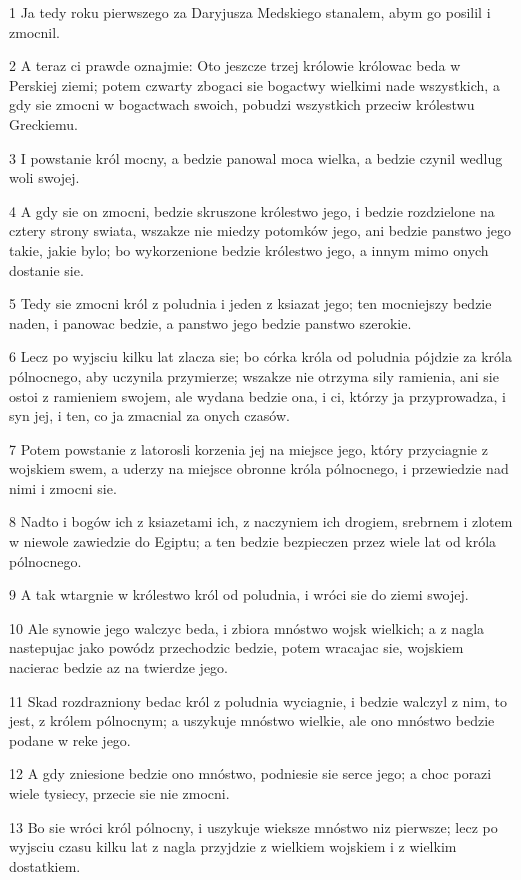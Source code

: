 \par 1 Ja tedy roku pierwszego za Daryjusza Medskiego stanalem, abym go posilil i zmocnil.
\par 2 A teraz ci prawde oznajmie: Oto jeszcze trzej królowie królowac beda w Perskiej ziemi; potem czwarty zbogaci sie bogactwy wielkimi nade wszystkich, a gdy sie zmocni w bogactwach swoich, pobudzi wszystkich przeciw królestwu Greckiemu.
\par 3 I powstanie król mocny, a bedzie panowal moca wielka, a bedzie czynil wedlug woli swojej.
\par 4 A gdy sie on zmocni, bedzie skruszone królestwo jego, i bedzie rozdzielone na cztery strony swiata, wszakze nie miedzy potomków jego, ani bedzie panstwo jego takie, jakie bylo; bo wykorzenione bedzie królestwo jego, a innym mimo onych dostanie sie.
\par 5 Tedy sie zmocni król z poludnia i jeden z ksiazat jego; ten mocniejszy bedzie naden, i panowac bedzie, a panstwo jego bedzie panstwo szerokie.
\par 6 Lecz po wyjsciu kilku lat zlacza sie; bo córka króla od poludnia pójdzie za króla pólnocnego, aby uczynila przymierze; wszakze nie otrzyma sily ramienia, ani sie ostoi z ramieniem swojem, ale wydana bedzie ona, i ci, którzy ja przyprowadza, i syn jej, i ten, co ja zmacnial za onych czasów.
\par 7 Potem powstanie z latorosli korzenia jej na miejsce jego, który przyciagnie z wojskiem swem, a uderzy na miejsce obronne króla pólnocnego, i przewiedzie nad nimi i zmocni sie.
\par 8 Nadto i bogów ich z ksiazetami ich, z naczyniem ich drogiem, srebrnem i zlotem w niewole zawiedzie do Egiptu; a ten bedzie bezpieczen przez wiele lat od króla pólnocnego.
\par 9 A tak wtargnie w królestwo król od poludnia, i wróci sie do ziemi swojej.
\par 10 Ale synowie jego walczyc beda, i zbiora mnóstwo wojsk wielkich; a z nagla nastepujac jako powódz przechodzic bedzie, potem wracajac sie, wojskiem nacierac bedzie az na twierdze jego.
\par 11 Skad rozdrazniony bedac król z poludnia wyciagnie, i bedzie walczyl z nim, to jest, z królem pólnocnym; a uszykuje mnóstwo wielkie, ale ono mnóstwo bedzie podane w reke jego.
\par 12 A gdy zniesione bedzie ono mnóstwo, podniesie sie serce jego; a choc porazi wiele tysiecy, przecie sie nie zmocni.
\par 13 Bo sie wróci król pólnocny, i uszykuje wieksze mnóstwo niz pierwsze; lecz po wyjsciu czasu kilku lat z nagla przyjdzie z wielkiem wojskiem i z wielkim dostatkiem.
